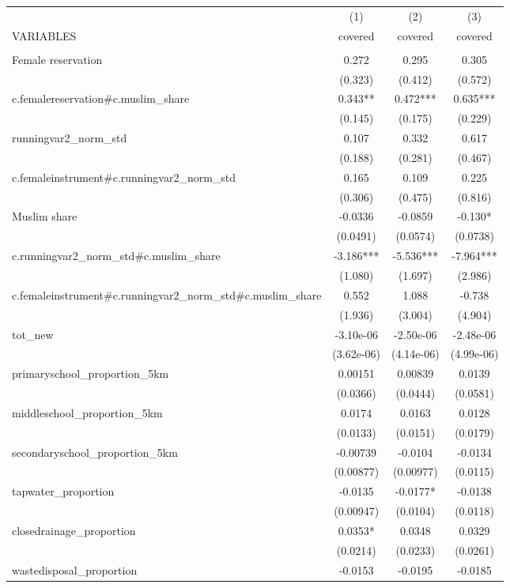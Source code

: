 \begin{tabular}{lccc} \hline
 & (1) & (2) & (3) \\
VARIABLES & covered & covered & covered \\ \hline
 &  &  &  \\
Female reservation & 0.272 & 0.295 & 0.305 \\
 & (0.323) & (0.412) & (0.572) \\
c.femalereservation\#c.muslim\_share & 0.343** & 0.472*** & 0.635*** \\
 & (0.145) & (0.175) & (0.229) \\
runningvar2\_norm\_std & 0.107 & 0.332 & 0.617 \\
 & (0.188) & (0.281) & (0.467) \\
c.femaleinstrument\#c.runningvar2\_norm\_std & 0.165 & 0.109 & 0.225 \\
 & (0.306) & (0.475) & (0.816) \\
Muslim share & -0.0336 & -0.0859 & -0.130* \\
 & (0.0491) & (0.0574) & (0.0738) \\
c.runningvar2\_norm\_std\#c.muslim\_share & -3.186*** & -5.536*** & -7.964*** \\
 & (1.080) & (1.697) & (2.986) \\
c.femaleinstrument\#c.runningvar2\_norm\_std\#c.muslim\_share & 0.552 & 1.088 & -0.738 \\
 & (1.936) & (3.004) & (4.904) \\
tot\_new & -3.10e-06 & -2.50e-06 & -2.48e-06 \\
 & (3.62e-06) & (4.14e-06) & (4.99e-06) \\
primaryschool\_proportion\_5km & 0.00151 & 0.00839 & 0.0139 \\
 & (0.0366) & (0.0444) & (0.0581) \\
middleschool\_proportion\_5km & 0.0174 & 0.0163 & 0.0128 \\
 & (0.0133) & (0.0151) & (0.0179) \\
secondaryschool\_proportion\_5km & -0.00739 & -0.0104 & -0.0134 \\
 & (0.00877) & (0.00977) & (0.0115) \\
tapwater\_proportion & -0.0135 & -0.0177* & -0.0138 \\
 & (0.00947) & (0.0104) & (0.0118) \\
closedrainage\_proportion & 0.0353* & 0.0348 & 0.0329 \\
 & (0.0214) & (0.0233) & (0.0261) \\
wastedisposal\_proportion & -0.0153 & -0.0195 & -0.0185 \\

\end{tabular}
